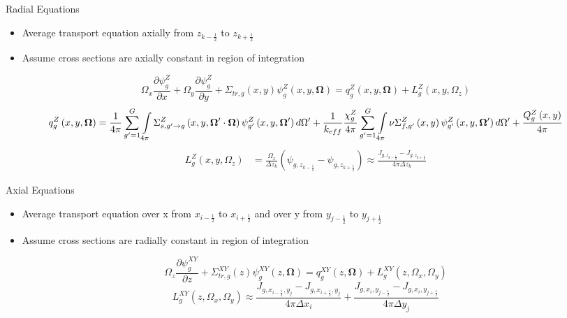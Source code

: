 \begin{frame}[t]{Radial Equations}
    
    \begin{itemize}
      \item Average transport equation axially from $z_{k-\frac{1}{2}}$ to 
      $z_{k+\frac{1}{2}}$
      \item Assume cross sections are axially constant in region of integration
    \end{itemize}
    \begin{dmath*}
        {\Omega_x\frac{\partial \psi_{g}^Z}{\partial x} + 
        \Omega_y\frac{\partial \psi_{g}^Z}{\partial y}} + 
        {\Sigma_{tr,g}\left(x,y\right)\psi_{g}^Z\left(x,y,\bm\Omega\right)} = 
        {q_{g}^Z\left(x,y,\bm \Omega\right)} + 
        {L_{g}^Z\left(x,y,\Omega_z\right)}
    \end{dmath*}
    \begin{dmath*}
        {q_{g}^Z\left(x,y,\bm \Omega\right)} = 
        {\frac{1}{4\pi}\sum_{g'=1}^{G}\intop_{4\pi}\Sigma_{s,g'\rightarrow 
        g}^Z\left(x,y,\bm\Omega'\cdot\bm\Omega\right)\psi_{g'}^Z\left(x,y,\bm\Omega'\right)d\Omega'}
         + {\frac{1}{k_{eff}}\frac{\chi_{g}^Z}{4\pi}\sum_{g'=1}^G\intop_{4\pi} 
        \nu\Sigma_{f,g'}^Z\left(x,y\right)\psi_{g'}^Z\left(x,y,\bm\Omega'\right)d\Omega'}
         + {\frac{Q_{g}^Z\left(x,y\right)}{4\pi}}
    \end{dmath*}
    \begin{align*}
    L_{g}^Z\left(x,y,\Omega_z\right) &= \frac{\Omega_z}{\Delta z_k}\left(\psi_{g,z_{k-\frac{1}{2}}} - \psi_{g,z_{k+\frac{1}{2}}}\right) \approx \frac{J_{g,z_{k-\frac{1}{2}}} - J_{g,z_{k+\frac{1}{2}}}}{4\pi\Delta z_k}
    \end{align*}
    
\end{frame}


\begin{frame}[t]{Axial Equations}

\begin{itemize}
  \item Average transport equation over x from $x_{i-\frac{1}{2}}$ to 
  $x_{i+\frac{1}{2}}$ and over y from $y_{j-\frac{1}{2}}$ to $y_{j+\frac{1}{2}}$
  \item Assume cross sections are radially constant in region of integration
\end{itemize}
\begin{dmath*}
{\Omega_z \frac{\partial \psi_{g}^{XY}}{\partial z}} + 
{\Sigma_{tr,g}^{XY}\left(z\right)\psi_{g}^{XY}\left(z,\bm\Omega\right)} = 
q_{g}^{XY}\left(z,\bm\Omega\right) + 
{L_{g}^{XY}\left(z,\Omega_x,\Omega_y\right)}
\end{dmath*}
\begin{equation*}
L_{g}^{XY}\left(z,\Omega_x,\Omega_y\right) \approx 
{\frac{J_{g,x_{i-\frac{1}{2}},y_j} - 
  J_{g,x_{i+\frac{1}{2}},y_j}}{4\pi\Delta x_i}} +
\frac{J_{g,x_i,y_{j-\frac{1}{2}}} - J_{g,x_i,y_{j+\frac{1}{2}}}}{4\pi\Delta 
y_j}
\end{equation*}

\end{frame}

